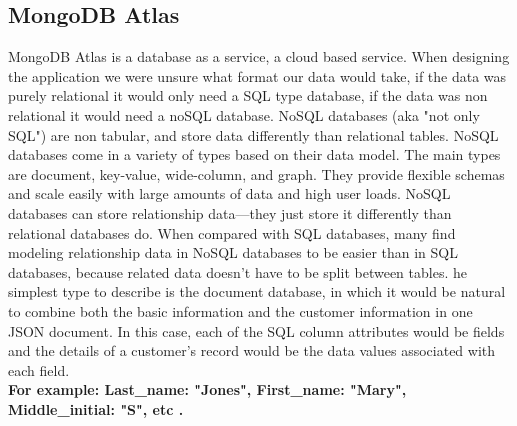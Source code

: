 \subsection{MongoDB Atlas}
MongoDB Atlas is a database as a service, a cloud based service.
When designing the application we were unsure what format our data would take, if the data was purely relational it would only need a SQL type database, if the data was non relational it would need a noSQL database.
NoSQL databases (aka "not only SQL") are non tabular, and store data differently than relational tables. NoSQL databases come in a variety of types based on their data model. The main types are document, key-value, wide-column, and graph. They provide flexible schemas and scale easily with large amounts of data and high user loads.  NoSQL databases can store relationship data—they just store it differently than relational databases do. When compared with SQL databases, many find modeling relationship data in NoSQL databases to be easier than in SQL databases, because related data doesn’t have to be split between tables. he simplest type to describe is the document database, in which it would be natural to combine both the basic information and the customer information in one JSON document. In this case, each of the SQL column attributes would be fields and the details of a customer’s record would be the data values associated with each field.\cite{mongodb}\\
\vspace{2mm}
\textbf{For example: Last\_name: "Jones", First\_name: "Mary", Middle\_initial: "S", etc .}
\vspace{2mm}

